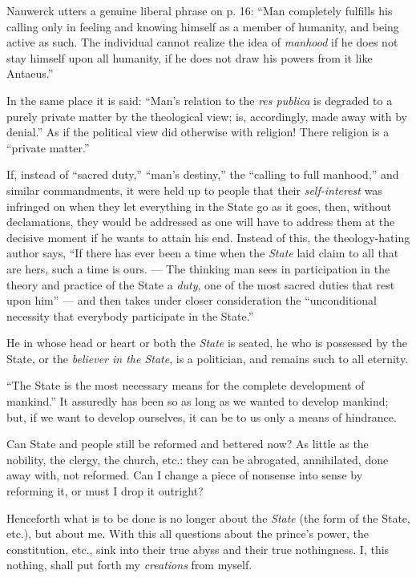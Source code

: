Nauwerck utters a genuine liberal phrase on p. 16: ``Man completely fulfills 
his calling only in feeling and knowing himself as a member of humanity, and 
being active as such. The individual cannot realize the idea of 
\textit{manhood} if he does not stay himself upon all humanity, if he does not 
draw his powers from it like Antaeus.''

In the same place it is said: ``Man's relation to the \textit{res publica} is 
degraded to a purely private matter by the theological view; is, accordingly, 
made away with by denial.'' As if the political view did otherwise with 
religion! There religion is a ``private matter.''

If, instead of ``sacred duty,'' ``man's destiny,'' the ``calling to full 
manhood,'' and similar commandments, it were held up to people that their 
\textit{self-interest} was infringed on when they let everything in the State 
go as it goes, then, without declamations, they would be addressed as one will 
have to address them at the decisive moment if he wants to attain his end. 
Instead of this, the theology-hating author says, ``If there has ever been a 
time when the \textit{State} laid claim to all that are hers, such a time is 
ours. --- The thinking man sees in participation in the theory and practice of 
the State a \textit{duty}, one of the most sacred duties that rest upon him'' --- and then takes under closer consideration the ``unconditional necessity 
that everybody participate in the State.''

He in whose head or heart or both the \textit{State} is seated, he who is 
possessed by the State, or the \textit{believer in the State}, is a 
politician, and remains such to all eternity.

``The State is the most necessary means for the complete development of 
mankind.'' It assuredly has been so as long as we wanted to develop mankind; 
but, if we want to develop ourselves, it can be to us only a means of 
hindrance.

Can State and people still be reformed and bettered now? As little as the 
nobility, the clergy, the church, etc.: they can be abrogated, annihilated, 
done away with, not reformed. Can I change a piece of nonsense into sense by 
reforming it, or must I drop it outright?

Henceforth what is to be done is no longer about the \textit{State} (the form 
of the State, etc.), but about me. With this all questions about the prince's 
power, the constitution, etc., sink into their true abyss and their true 
nothingness. I, this nothing, shall put forth my \textit{creations} from 
myself.

